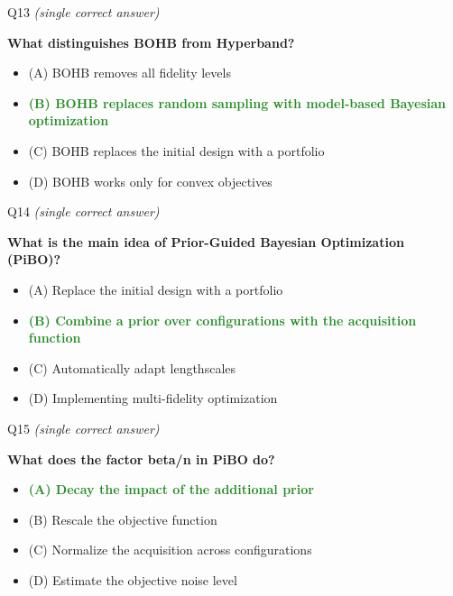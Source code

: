 \documentclass[main]{subfiles}
\newcommand{\correct}[1]{\textcolor{ForestGreen}{\textbf{#1} \checkmark}}
\newcommand{\wrong}[1]{#1}
\begin{document}
\begin{frame}{Q13 \hfill \small\normalfont\textit{(single correct answer)}}

\textbf{What distinguishes BOHB from Hyperband?}

\begin{itemize}
    \item \wrong{(A) \; BOHB removes all fidelity levels}
    \item \correct{(B) \; BOHB replaces random sampling with model-based Bayesian optimization}
    \item \wrong{(C) \; BOHB replaces the initial design with a portfolio}
    \item \wrong{(D) \; BOHB works only for convex objectives}
\end{itemize}

\end{frame}
\begin{frame}{Q14 \hfill \small\normalfont\textit{(single correct answer)}}

\textbf{What is the main idea of Prior-Guided Bayesian Optimization (PiBO)?}

\begin{itemize}
    \item \wrong{(A) \; Replace the initial design with a portfolio}
    \item \correct{(B) \; Combine a prior over configurations with the acquisition function}
    \item \wrong{(C) \; Automatically adapt lengthscales
    }
    \item \wrong{(D) \; Implementing multi-fidelity optimization}
\end{itemize}

\end{frame}
\begin{frame}{Q15 \hfill \small\normalfont\textit{(single correct answer)}}

\textbf{What does the factor beta/n in PiBO do?}

\begin{itemize}
    \item \correct{(A) \; Decay the impact of the additional prior}
    \item \wrong{(B) \; Rescale the objective function}
    \item \wrong{(C) \; Normalize the acquisition across configurations}
    \item \wrong{(D) \; Estimate the objective noise level}
\end{itemize}

\end{frame}
\end{document}
